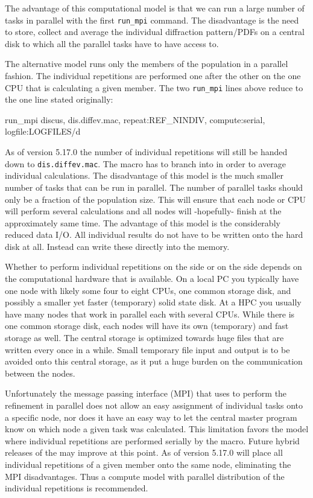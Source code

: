 The advantage
of this computational model is that we can run a large number of tasks in parallel with
the first {\tt run\_mpi} command. The disadvantage is the need to store, 
collect and average the individual diffraction pattern/PDFs on a central 
disk to which all the parallel tasks have to have access to.

The alternative model runs only the members of the population in a parallel
fashion. The individual repetitions are performed one after the other on the
one CPU that is calculating a given member. The two {\tt run\_mpi} lines above 
reduce to the one line stated originally: 
\begin{MacVerbatim}
    run_mpi discus, dis.diffev.mac, repeat:REF_NINDIV, compute:serial, logfile:LOGFILES/d
\end{MacVerbatim}

As of version 5.17.0 the number of individual repetitions will still be 
handed down to {\tt dis.diffev.mac}.  The macro has to 
branch into \Kuplot in order to average individual calculations. The 
disadvantage of this model is the much smaller number of tasks that can be run 
in parallel. The number of parallel tasks should only be a fraction of the 
population size. This will ensure that each node or CPU will perform several 
calculations and all nodes will -hopefully- finish at the approximately same
time. The advantage of this model is the considerably reduced data I/O. All
individual results do not have to be written onto the hard disk at all. Instead
\Discus can write these directly into the \Kuplot memory. 

Whether to perform individual repetitions on the \Diffev side or on the
\Discus side depends on the computational hardware that is available. 
On a local PC you typically have one node with likely some four to eight CPUs,
one common storage disk, and possibly a smaller yet faster (temporary) 
solid state disk. 
At a HPC you usually have many nodes that work in parallel each with several
CPUs. While there is one common storage disk, each nodes will have its own 
(temporary) and fast storage as well. The central storage is optimized towards
huge files that are written every once in a while. Small temporary file input
 and output is to be avoided onto this central storage, as it put a huge burden 
on the communication between the nodes. 

Unfortunately the message passing interface (MPI) that \Diffev uses to perform
the refinement in parallel does not allow an easy assignment of individual tasks
onto a specific node, nor does it have an easy way to let the central master 
program know on which node a given task was calculated.  This limitation 
favors the model where individual repetitions are performed serially by the
\Discus macro. Future hybrid releases of the \Suite may improve at this point.
As of version 5.17.0 \Diffev will place all individual repetitions of a given
member onto the same node, eliminating the MPI disadvantages. Thus a compute
model with parallel distribution of the individual repetitions is recommended.

